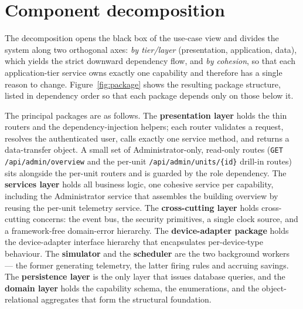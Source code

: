 
\section{Component decomposition}
\label{sec:components}

The decomposition opens the black box of the use-case view and divides the system
along two orthogonal axes: \emph{by tier/layer} (presentation, application, data),
which yields the strict downward dependency flow, and \emph{by cohesion}, so that
each application-tier service owns exactly one capability and therefore has a single
reason to change. Figure~\ref{fig:package} shows the resulting package structure,
listed in dependency order so that each package depends only on those below it.


The principal packages are as follows. The \textbf{presentation layer} holds the thin
routers and the dependency-injection helpers; each router validates a request,
resolves the authenticated user, calls exactly one service method, and returns a
data-transfer object. A small set of Administrator-only, read-only routes
(\texttt{GET /api/admin/overview} and the per-unit \texttt{/api/admin/units/\{id\}}
drill-in routes) sits alongside the per-unit routers and is guarded by the role
dependency. The \textbf{services layer} holds all business logic, one
cohesive service per capability, including the Administrator service that assembles
the building overview by reusing the per-unit telemetry service. The \textbf{cross-cutting layer} holds cross-cutting
concerns: the event bus, the security primitives, a single clock source, and a
framework-free domain-error hierarchy. The \textbf{device-adapter package} holds the
device-adapter interface hierarchy that encapsulates per-device-type behaviour. The
\textbf{simulator} and the \textbf{scheduler} are the two background workers --- the
former generating telemetry, the latter firing rules and accruing savings. The
\textbf{persistence layer} is the only layer that issues database queries, and the
\textbf{domain layer} holds the capability schema, the enumerations, and the
object-relational aggregates that form the structural foundation.

